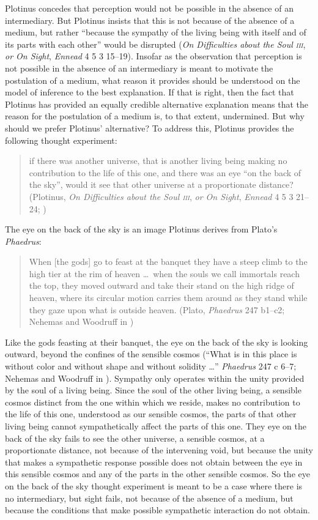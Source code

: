 Plotinus concedes that perception would not be possible in the absence of an intermediary. But Plotinus insists that this is not because of the absence of a medium, but rather ``because the sympathy of the living being with itself and of its parts with each other'' would be disrupted (\emph{On Difficulties about the Soul \textsc{iii}}, \emph{or On Sight}, \emph{Ennead} 4 5 3 15--19). Insofar as the observation that perception is not possible in the absence of an intermediary is meant to motivate the postulation of a medium, what reason it provides should be understood on the model of inference to the best explanation. If that is right, then the fact that Plotinus has provided an equally credible alternative explanation means that the reason for the postulation of a medium is, to that extent, undermined. But why should we prefer Plotinus' alternative? To address this, Plotinus provides the following thought experiment:
\begin{quote}
	if there was another universe, that is another living being making no contribution to the life of this one, and there was an eye ``on the back of the sky'', would it see that other universe at a proportionate distance? (Plotinus, \emph{On Difficulties about the Soul \textsc{iii}}, \emph{or On Sight}, \emph{Ennead} 4 5 3 21--24; \citealt[293]{Armstrong:1984aa})
\end{quote}
 The eye on the back of the sky is an image Plotinus derives from Plato's \emph{Phaedrus}:
\begin{quote}
	When [the gods] go to feast at the banquet they have a steep climb to the high tier at the rim of heaven \ldots\ when the souls we call immortals reach the top, they moved outward and take their stand on the high ridge of heaven, where its circular motion carries them around as they stand while they gaze upon what is outside heaven. (Plato, \emph{Phaedrus} 247 b1--c2; Nehemas and Woodruff in \citealt[525]{Cooper:1997fk})
\end{quote}
Like the gods feasting at their banquet, the eye on the back of the sky is looking outward, beyond the confines of the sensible cosmos (``What is in this place is without color and without shape and without solidity \ldots'' \emph{Phaedrus} 247 c 6--7; Nehemas and Woodruff in \citealt[525]{Cooper:1997fk}). Sympathy only operates within the unity provided by the soul of a living being. Since the soul of the other living being, a sensible cosmos distinct from the one within which we reside, makes no contribution to the life of this one, understood as our sensible cosmos, the parts of that other living being cannot sympathetically affect the parts of this one. They eye on the back of the sky fails to see the other universe, a sensible cosmos, at a proportionate distance, not because of the intervening void, but because the unity that makes a sympathetic response possible does not obtain between the eye in this sensible cosmos and any of the parts in the other sensible cosmos. So the eye on the back of the sky thought experiment is meant to be a case where there is no intermediary, but sight fails, not because of the absence of a medium, but because the conditions that make possible sympathetic interaction do not obtain.


